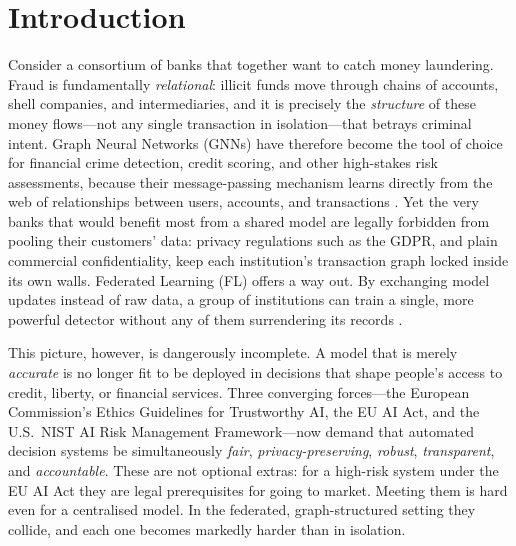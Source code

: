 \section{Introduction}
\label{sec:intro}

\noindent Consider a consortium of banks that together want to catch money
laundering. Fraud is fundamentally \emph{relational}: illicit funds move through
chains of accounts, shell companies, and intermediaries, and it is precisely the
\emph{structure} of these money flows---not any single transaction in
isolation---that betrays criminal intent. Graph Neural Networks (GNNs) have
therefore become the tool of choice for financial crime detection, credit
scoring, and other high-stakes risk assessments, because their message-passing
mechanism learns directly from the web of relationships between users, accounts,
and transactions \cite{kipf2016semi,velickovic2017graph,dou2020enhancing}. Yet
the very banks that would benefit most from a shared model are legally forbidden
from pooling their customers' data: privacy regulations such as the GDPR, and
plain commercial confidentiality, keep each institution's transaction graph
locked inside its own walls. Federated Learning (FL) offers a way out. By
exchanging model updates instead of raw data, a group of institutions can train
a single, more powerful detector without any of them surrendering its records
\cite{mcmahan2017communication}.

This picture, however, is dangerously incomplete. A model that is merely
\emph{accurate} is no longer fit to be deployed in decisions that shape people's
access to credit, liberty, or financial services. Three converging forces---the
European Commission's Ethics Guidelines for Trustworthy AI, the EU AI Act, and
the U.S.\ NIST AI Risk Management Framework---now demand that automated
decision systems be simultaneously \emph{fair}, \emph{privacy-preserving},
\emph{robust}, \emph{transparent}, and \emph{accountable}. These are not
optional extras: for a high-risk system under the EU AI Act they are legal
prerequisites for going to market. Meeting them is hard even for a centralised
model. In the federated, graph-structured setting they collide, and each one
becomes markedly harder than in isolation.

